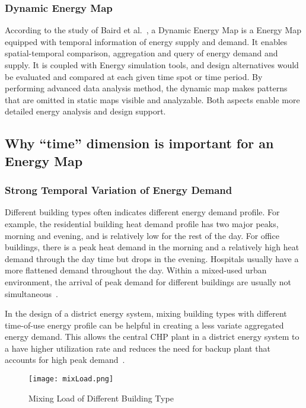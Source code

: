 \documentclass[hidelinks,12pt]{article}
\begin{document}
\subsubsection{Dynamic Energy Map}
According to the study of Baird et al.\ , a Dynamic Energy Map is a
Energy Map equipped with temporal information of energy supply and
demand. It enables spatial-temporal comparison, aggregation and query
of energy demand and supply. It is coupled with Energy simulation
tools, and design alternatives would be evaluated and compared at each
given time spot or time period. By performing advanced data analysis
method, the dynamic map makes patterns that are omitted in static maps
visible and analyzable. Both aspects enable more detailed energy
analysis and design support.

\subsection{Why ``time'' dimension is important for an Energy Map}
\subsubsection{Strong Temporal Variation of Energy Demand}
Different building types often indicates different energy demand
profile. For example, the residential building heat demand profile has
two major peaks, morning and evening, and is relatively low for the
rest of the day. For office buildings, there is a peak heat demand in
the morning and a relatively high heat demand through the day time but
drops in the evening. Hospitals usually have a more flattened demand
throughout the day. Within a mixed-used urban environment, the arrival
of peak demand for different buildings are usually not
simultaneous~\cite{decentralHeatMap2011}.

In the design of a district energy system, mixing building types with
different time-of-use energy profile can be helpful in creating a less
variate aggregated energy demand. This allows the central CHP plant in
a district energy system to a have higher utilization rate and reduces
the need for backup plant that accounts for high peak
demand~\cite{decentralHeatMap2011}.

\begin{figure}[h!]
  \centering
  \texttt{[image: mixLoad.png]}
  \caption{Mixing Load of Different Building
    Type~\cite{decentralHeatMap2011}}
  \label{fig:mixLoad}
\end{figure}
\end{document}
